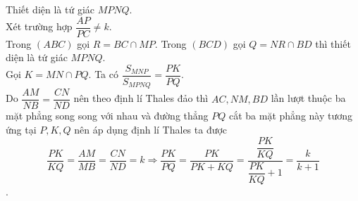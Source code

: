 \begin{bt}
{\begin{enumerate}
			Thiết diện là tứ giác $MPNQ$.\\
			Xét trường hợp $\dfrac{AP}{PC}\ne k$.\\
			Trong $\left( ABC \right)$ gọi $R=BC\cap MP$. 
			Trong $\left( BCD \right)$ gọi $Q=NR\cap BD$ thì thiết diện là tứ giác $MPNQ$.\\
			Gọi $K=MN\cap PQ$. Ta có  $\dfrac{{{S}_{MNP}}}{{{S}_{MPNQ}}}=\dfrac{PK}{PQ}$.\\
			Do $\dfrac{AM}{NB}=\dfrac{CN}{ND}$ nên theo định lí Thales đảo thì $AC,NM,BD$ lần lượt thuộc ba mặt phẳng song song với nhau và đường thẳng $PQ$ cắt ba mặt phẳng này tương ứng tại $P,K,Q$ nên áp dụng định lí Thales ta được $$\dfrac{PK}{KQ}=\dfrac{AM}{MB}=\dfrac{CN}{ND}=k\Rightarrow \dfrac{PK}{PQ}=\dfrac{PK}{PK+KQ}=\dfrac{\dfrac{PK}{KQ}}{\dfrac{PK}{KQ}+1}=\dfrac{k}{k+1}$$.
		\end{enumerate}
	}
\end{bt}

